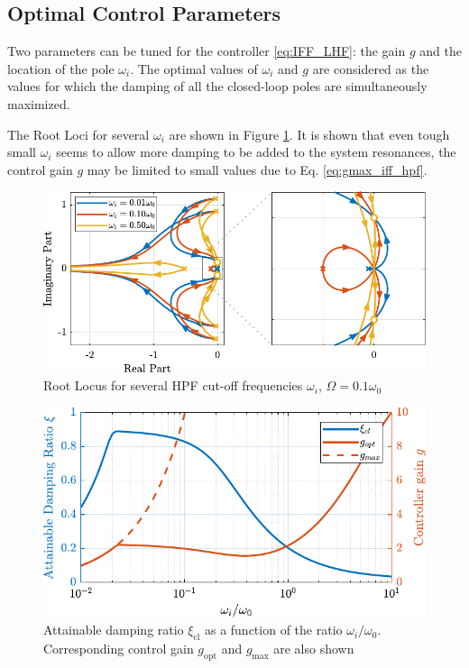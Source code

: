 \documentclass{ISMA_USD2020}
\begin{document}
\subsection{Optimal Control Parameters}
\label{sec:org8e0597b}

Two parameters can be tuned for the controller \eqref{eq:IFF_LHF}: the gain \(g\) and the location of the pole \(\omega_i\).
The optimal values of \(\omega_i\) and \(g\) are considered as the values for which the damping of all the closed-loop poles are simultaneously maximized.

The Root Loci for several \(\omega_i\) are shown in Figure \ref{fig:root_locus_wi_modified_iff}.
It is shown that even tough small \(\omega_i\) seems to allow more damping to be added to the system resonances, the control gain \(g\) may be limited to small values due to Eq. \eqref{eq:gmax_iff_hpf}.

\begin{figure}[htbp]
\centering
\includegraphics[scale=1]{figs/root_locus_wi_modified_iff.pdf}
\caption{\label{fig:root_locus_wi_modified_iff}Root Locus for several HPF cut-off frequencies \(\omega_i\), \(\Omega = 0.1 \omega_0\)}
\end{figure}

\begin{figure}[htbp]
\centering
\includegraphics[scale=1]{figs/mod_iff_damping_wi.pdf}
\caption{\label{fig:mod_iff_damping_wi}Attainable damping ratio \(\xi_\text{cl}\) as a function of the ratio \(\omega_i/\omega_0\). Corresponding control gain \(g_\text{opt}\) and \(g_\text{max}\) are also shown}
\end{figure}
\end{document}
